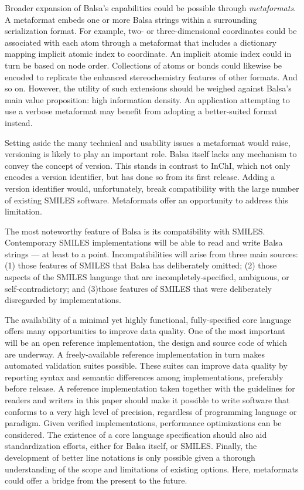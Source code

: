 \documentclass{article}
\begin{document}
Broader expansion of Balsa's capabilities could be possible through \textit{metaformats}. A metaformat embeds one or more Balsa strings within a surrounding serialization format. For example, two- or three-dimensional coordinates could be associated with each atom through a metaformat that includes a dictionary mapping implicit atomic index to coordinate. An implicit atomic index could in turn be based on node order. Collections of atoms or bonds could likewise be encoded to replicate the enhanced stereochemistry features of other formats. And so on. However, the utility of such extensions should be weighed against Balsa's main value proposition: high information density. An application attempting to use a verbose metaformat may benefit from adopting a better-suited format instead.

Setting aside the many technical and usability issues a metaformat would raise, versioning is likely to play an important role. Balsa itself lacks any mechanism to convey the concept of version. This stands in contrast to InChI, which not only encodes a version identifier, but has done so from its first release. Adding a version identifier would, unfortunately, break compatibility with the large number of existing SMILES software. Metaformats offer an opportunity to address this limitation.

The most noteworthy feature of Balsa is its compatibility with SMILES. Contemporary SMILES implementations will be able to read and write Balsa strings --- at least to a point. Incompatibilities will arise from three main sources: (1) those features of SMILES that Balsa has deliberately omitted; (2) those aspects of the SMILES language that are incompletely-specified, ambiguous, or self-contradictory; and (3)those features of SMILES that were deliberately disregarded by implementations.

The availability of a minimal yet highly functional, fully-specified core language offers many opportunities to improve data quality. One of the most important will be an open reference implementation, the design and source code of which are underway. A freely-available reference implementation in turn makes automated validation suites possible. These suites can improve data quality by reporting syntax and semantic differences among implementations, preferably before release. A reference implementation taken together with the guidelines for readers and writers in this paper should make it possible to write software that conforms to a very high level of precision, regardless of programming language or paradigm. Given verified implementations, performance optimizations can be considered. The existence of a core language specification should also aid standardization efforts, either for Balsa itself, or SMILES. Finally, the development of better line notations is only possible given a thorough understanding of the scope and limitations of existing options. Here, metaformats could offer a bridge from the present to the future.
\end{document}
